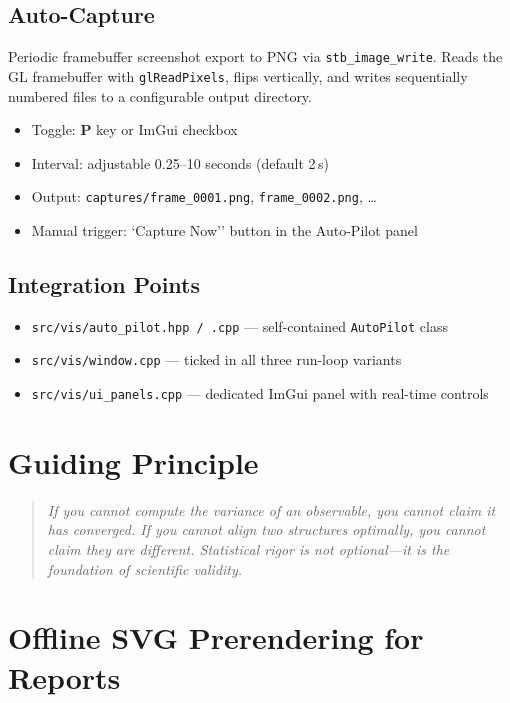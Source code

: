 ﻿\documentclass[11pt]{article}
\begin{document}
\subsection{Auto-Capture}

Periodic framebuffer screenshot export to PNG via \texttt{stb\_image\_write}.
Reads the GL framebuffer with \texttt{glReadPixels}, flips vertically, and
writes sequentially numbered files to a configurable output directory.

\begin{itemize}
\item Toggle: \textbf{P} key or ImGui checkbox
\item Interval: adjustable 0.25--10 seconds (default 2\,s)
\item Output: \texttt{captures/frame\_0001.png}, \texttt{frame\_0002.png}, \ldots
\item Manual trigger: `Capture Now'' button in the Auto-Pilot panel
\end{itemize}

\subsection{Integration Points}

\begin{itemize}
\item \texttt{src/vis/auto\_pilot.hpp / .cpp} --- self-contained \texttt{AutoPilot} class
\item \texttt{src/vis/window.cpp} --- ticked in all three run-loop variants
\item \texttt{src/vis/ui\_panels.cpp} --- dedicated ImGui panel with real-time controls
\end{itemize}

\section{Guiding Principle}

\begin{quote}
\textit{If you cannot compute the variance of an observable, you cannot claim it
has converged. If you cannot align two structures optimally, you cannot claim
they are different. Statistical rigor is not optional---it is the foundation of
scientific validity.}
\end{quote}


\section{Offline SVG Prerendering for Reports}
\end{document}

